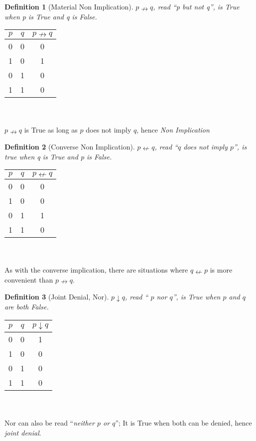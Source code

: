 \documentclass[10pt,a4paper,draft,titlepage,onecolumn]{book}
\newtheorem{definition}{Definition}[subsection]
\begin{document}
\begin{definition}[Material Non Implication]$p{\nrightarrow}q$, read ``p but not q'', is True when p is True and q is False.
\end{definition}
\begin{tabular}{ |c|c|c| }
 \hline
 $p$ & $q$ & $p{\nrightarrow}q$  \\
 \hline
 0 & 0 & 0 \\
 1 & 0 & 1\\
 0 & 1 & 0\\
 1 & 1 & 0\\
 \hline
\end{tabular} \\\\
$p{\nrightarrow}q$ is True as long as $p$ does not imply $q$, hence \textit{Non Implication}


\begin{definition}[Converse Non Implication]$p{\nleftarrow}q$, read ``$q$ does not imply $p$'', is true when q is True and p is False.
\end{definition}  
\begin{tabular}{ |c|c|c| }
 \hline
   $p$ & $q$ &  $p{\nleftarrow}q$  \\
 \hline
 0 & 0 & 0 \\
 1 & 0 & 0\\
 0 & 1 & 1\\
 1 & 1 & 0\\
 \hline
\end{tabular}\\\\
As with the converse implication, there are situations where $q{ \nleftarrow}p$  is more convenient than $p{\nrightarrow}q$.



\begin{definition}[Joint Denial, Nor]$p{\downarrow}q$, read `` $p$ nor $q$'', is True when $p$ and $q$ are both False.
\end{definition}
\begin{tabular}{ |c|c|c| }
 \hline
   $p$ & $q$ &  $p{\downarrow}q$ \\
 \hline
 0 & 0 & 1 \\
 1 & 0 & 0\\
 0 & 1 & 0\\
 1 & 1 & 0\\
 \hline
\end{tabular}\\\\
Nor can also be read ``\textit{neither $p$ or $q$}''; It is True when both can be denied, hence \textit{joint denial}.\\
\end{document}
